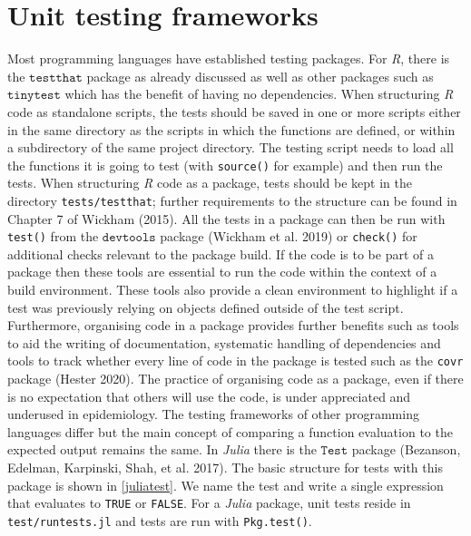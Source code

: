 \documentclass[
]{article}
\begin{document}
\hypertarget{frameworks}{%
\section{Unit testing frameworks}\label{frameworks}}

Most programming languages have established testing packages.
For \emph{R}, there is the \(\texttt{testthat}\) package as already discussed as well as other packages such as \(\texttt{tinytest}\) which has the benefit of having no dependencies.
When structuring \emph{R} code as standalone scripts, the tests should be saved in one or more scripts either in the same directory as the scripts in which the functions are defined, or within a subdirectory of the same project directory.
The testing script needs to load all the functions it is going to test (with \texttt{source()} for example) and then run the tests.
When structuring \emph{R} code as a package, tests should be kept in the directory \texttt{tests/testthat}; further requirements to the structure can be found in Chapter 7 of Wickham (2015).
All the tests in a package can then be run with \texttt{test()} from the \(\texttt{devtools}\) package (Wickham et al. 2019) or \texttt{check()} for additional checks relevant to the package build.
If the code is to be part of a package then these tools are essential to run the code within the context of a build environment.
These tools also provide a clean environment to highlight if a test was previously relying on objects defined outside of the test script.
Furthermore, organising code in a package provides further benefits such as tools to aid the writing of documentation, systematic handling of dependencies and tools to track whether every line of code in the package is tested such as the \texttt{covr} package (Hester 2020).
The practice of organising code as a package, even if there is no expectation that others will use the code, is under appreciated and underused in epidemiology.
\newline
\newline
The testing frameworks of other programming languages differ but the main concept of comparing a function evaluation to the expected output remains the same.
In \emph{Julia} there is the \(\texttt{Test}\) package (Bezanson, Edelman, Karpinski, Shah, et al. 2017).
The basic structure for tests with this package is shown in \ref{juliatest}.
We name the test and write a single expression that evaluates to \texttt{TRUE} or \texttt{FALSE}.
For a \emph{Julia} package, unit tests reside in \texttt{test/runtests.jl} and tests are run with \texttt{Pkg.test()}.
\newline
{}\label{juliatest}
\end{document}

